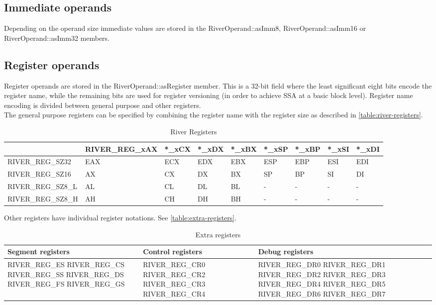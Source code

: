 \documentclass[12pt]{report}
\begin{document}
\subsection{Immediate operands}
\label{ssec:immediate-operands}
Depending on the operand size immediate values are stored in the RiverOperand::asImm8, RiverOperand::asImm16 or RiverOperand::asImm32 members.\\
\subsection{Register operands}
\label{ssec:register-operands}
Register operands are stored in the RiverOperand::asRegister member. This is a 32-bit field where the least significant eight bits encode the register name, while the remaining bits are used for register versioning (in order to achieve SSA at a basic block level). Register name encoding is divided between general purpose and other registers.\\
\newline
The general purpose registers can be specified by combining the register name with the register size as described in \autoref{table:river-registers}.\\
\begin{table}[H]
	\begin{tabular}{| p{3.6cm} | p{3.2cm} | p{1cm} | p{1cm} | p{1cm} | p{1cm} | p{1cm} | p{1cm} | p{1cm} |}
	\hline
	& RIVER_REG_xAX & *_xCX & *_xDX & *_xBX & *_xSP & *_xBP & *_xSI & *_xDI\\ \hline
	RIVER_REG_SZ32 & EAX & ECX & EDX & EBX & ESP & EBP & ESI & EDI\\ \hline
	RIVER_REG_SZ16 & AX & CX & DX & BX & SP & BP & SI & DI\\ \hline
	RIVER_REG_SZ8_L & AL & CL & DL & BL & - & - & - & -\\ \hline
	RIVER_REG_SZ8_H & AH & CH & DH & BH & - & - & - & -\\ \hline
	\end{tabular}
	\caption{River Registers}
	\label{table:river-registers}
\end{table}
Other registers have individual register notations. See \autoref{table:extra-registers}.\\
\begin{table}[H]
	\begin{tabular}{| p{5cm} | p{5cm} | p{5cm} |}
		\hline
		\textbf{Segment registers} & \textbf{Control registers} & \textbf{Debug registers} \\ \hline
		RIVER_REG_ES RIVER_REG_CS RIVER_REG_SS RIVER_REG_DS RIVER_REG_FS RIVER_REG_GS &
		RIVER_REG_CR0 RIVER_REG_CR2 RIVER_REG_CR3 RIVER_REG_CR4 &
		RIVER_REG_DR0 RIVER_REG_DR1 RIVER_REG_DR2 RIVER_REG_DR3 RIVER_REG_DR4 RIVER_REG_DR5 RIVER_REG_DR6 RIVER_REG_DR7\\ \hline
	\end{tabular}
	\caption{Extra registers}
	\label{table:extra-registers}
\end{table}
\end{document}

